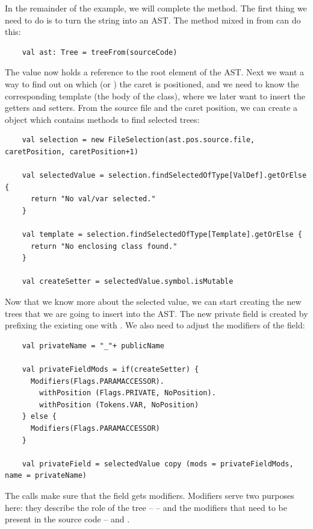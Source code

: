 \documentclass[10pt,a4paper,oneside]{scrreprt}
\begin{document}
In the remainder of the example, we will complete the  method. The first thing we need to do is to turn the  string into an AST. The  method mixed in from  can do this:

\begin{lstlisting}
    val ast: Tree = treeFrom(sourceCode)
\end{lstlisting}

The  value now holds a reference to the root element of the AST. Next we want a way to find out on which  (or ) the caret is positioned, and we need to know the corresponding template (the body of the class), where we later want to insert the getters and setters. From the source file and the caret position, we can create a  object which contains methods to find selected trees:
    
\begin{lstlisting}
    val selection = new FileSelection(ast.pos.source.file, caretPosition, caretPosition+1)
    
    val selectedValue = selection.findSelectedOfType[ValDef].getOrElse {
      return "No val/var selected."
    }
    
    val template = selection.findSelectedOfType[Template].getOrElse {
      return "No enclosing class found."
    }

    val createSetter = selectedValue.symbol.isMutable
\end{lstlisting}

Now that we know more about the selected value, we can start creating the new trees that we are going to insert into the AST. The new private field is created by prefixing the existing one with \src{\_}. We also need to adjust the modifiers of the field:

\begin{lstlisting}
    val privateName = "_"+ publicName
    
    val privateFieldMods = if(createSetter) {
      Modifiers(Flags.PARAMACCESSOR).
        withPosition (Flags.PRIVATE, NoPosition).
        withPosition (Tokens.VAR, NoPosition)
    } else {
      Modifiers(Flags.PARAMACCESSOR)
    }
      
    val privateField = selectedValue copy (mods = privateFieldMods, name = privateName)
\end{lstlisting}

The  calls make sure that the field gets  modifiers. Modifiers serve two purposes here: they describe the role of the tree -- \textsc{} -- and the modifiers that need to be present in the source code -- \textsc{} and \textsc{}.
\end{document}
